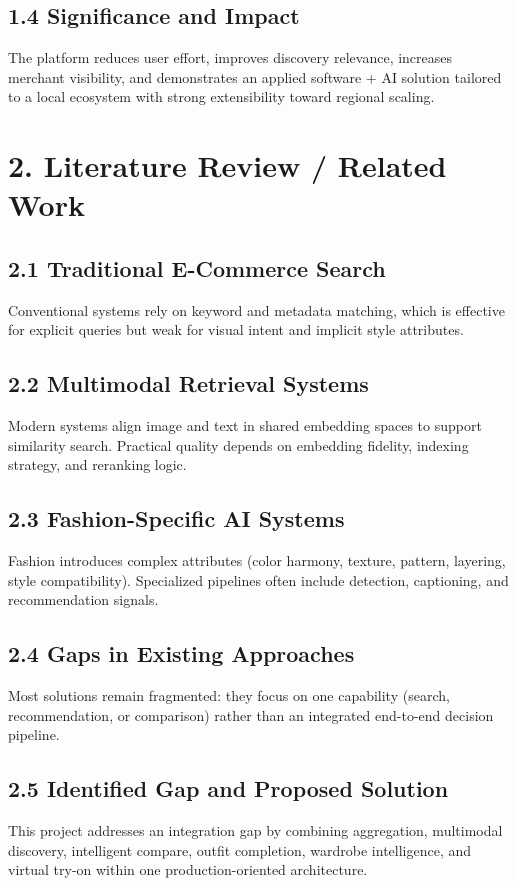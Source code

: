 \documentclass[12pt,a4paper]{report}
\begin{document}
\section{1.4 Significance and Impact}
The platform reduces user effort, improves discovery relevance, increases merchant visibility, and demonstrates an applied software + AI solution tailored to a local ecosystem with strong extensibility toward regional scaling.


\chapter{2. Literature Review / Related Work}
\section{2.1 Traditional E-Commerce Search}
Conventional systems rely on keyword and metadata matching, which is effective for explicit queries but weak for visual intent and implicit style attributes.


\section{2.2 Multimodal Retrieval Systems}
Modern systems align image and text in shared embedding spaces to support similarity search. Practical quality depends on embedding fidelity, indexing strategy, and reranking logic.


\section{2.3 Fashion-Specific AI Systems}
Fashion introduces complex attributes (color harmony, texture, pattern, layering, style compatibility). Specialized pipelines often include detection, captioning, and recommendation signals.


\section{2.4 Gaps in Existing Approaches}
Most solutions remain fragmented: they focus on one capability (search, recommendation, or comparison) rather than an integrated end-to-end decision pipeline.


\section{2.5 Identified Gap and Proposed Solution}
This project addresses an integration gap by combining aggregation, multimodal discovery, intelligent compare, outfit completion, wardrobe intelligence, and virtual try-on within one production-oriented architecture.
\end{document}
